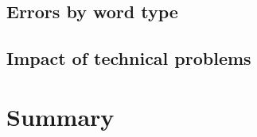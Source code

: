 		
		\subsection{Errors by word type}
		\label{sec:results:wordtype}
			\TODO{}
	
		\subsection{Impact of technical problems}
		\label{sec:results:techproblems}
			\TODO{}
	
	
	\section{Summary}
	\label{sec:lexstress:summary}
	\TODO{}